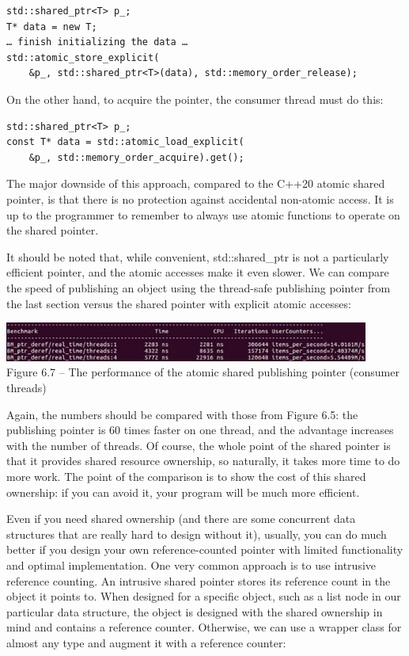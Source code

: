 \begin{lstlisting}[style=styleCXX]
std::shared_ptr<T> p_;
T* data = new T;
… finish initializing the data …
std::atomic_store_explicit(
	&p_, std::shared_ptr<T>(data), std::memory_order_release);
\end{lstlisting}

On the other hand, to acquire the pointer, the consumer thread must do this:

\begin{lstlisting}[style=styleCXX]
std::shared_ptr<T> p_;
const T* data = std::atomic_load_explicit(
	&p_, std::memory_order_acquire).get();
\end{lstlisting}

The major downside of this approach, compared to the C++20 atomic shared pointer, is that there is no protection against accidental non-atomic access. It is up to the programmer to remember to always use atomic functions to operate on the shared pointer.

It should be noted that, while convenient, std::shared\_ptr is not a particularly efficient pointer, and the atomic accesses make it even slower. We can compare the speed of publishing an object using the thread-safe publishing pointer from the last section versus the shared pointer with explicit atomic accesses:

\begin{center}
\includegraphics[width=0.9\textwidth]{content/2/chapter6/images/7.jpg}\\
Figure 6.7 – The performance of the atomic shared publishing pointer (consumer threads)
\end{center}

Again, the numbers should be compared with those from Figure 6.5: the publishing pointer is 60 times faster on one thread, and the advantage increases with the number of threads. Of course, the whole point of the shared pointer is that it provides shared resource ownership, so naturally, it takes more time to do more work. The point of the comparison is to show the cost of this shared ownership: if you can avoid it, your program will be much more efficient.

Even if you need shared ownership (and there are some concurrent data structures that are really hard to design without it), usually, you can do much better if you design your own reference-counted pointer with limited functionality and optimal implementation. One very common approach is to use intrusive reference counting. An intrusive shared pointer stores its reference count in the object it points to. When designed for a specific object, such as a list node in our particular data structure, the object is designed with the shared ownership in mind and contains a reference counter. Otherwise, we can use a wrapper class for almost any type and augment it with a reference counter:

